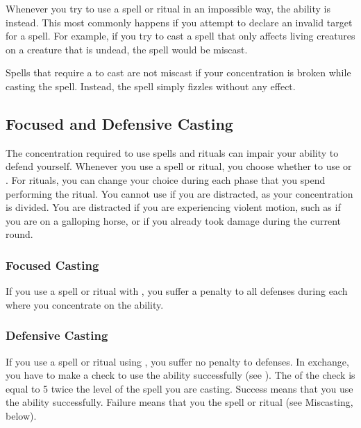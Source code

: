          Whenever you try to use a spell or ritual in an impossible way, the ability is  instead.
        This most commonly happens if you attempt to declare an invalid target for a spell.
        For example, if you try to cast a spell that only affects living creatures on a creature that is undead, the spell would be miscast.

         Spells that require a  to cast are not miscast if your concentration is broken while casting the spell.
        Instead, the spell simply fizzles without any effect.

    \subsection{Focused and Defensive Casting}\label{Focused and Defensive Casting}
        The concentration required to use spells and rituals can impair your ability to defend yourself.
        Whenever you use a spell or ritual, you choose whether to use  or .
        For rituals, you can change your choice during each phase that you spend performing the ritual.
        You cannot use  if you are distracted, as your concentration is divided.
        You are distracted if you are experiencing violent motion, such as if you are on a galloping horse, or if you already took damage during the current round.

        \subsubsection{Focused Casting}\label{Focused Casting}
            If you use a spell or ritual with , you suffer a  penalty to all defenses during each  where you concentrate on the ability.

        \subsubsection{Defensive Casting}\label{Defensive Casting}
            If you use a spell or ritual using , you suffer no penalty to defenses.
            In exchange, you have to make a  check to use the ability successfully (see ).
            The  of the check is equal to 5 \add twice the level of the spell you are casting.
            Success means that you use the ability successfully.
            Failure means that you  the spell or ritual (see Miscasting, below).

